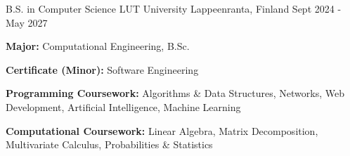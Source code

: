 

\begin{cventries}

  \cventryalt
    {B.S. in Computer Science} %
    {LUT University} %
    {Lappeenranta, Finland} %
    {Sept 2024 - May 2027} %
    {
      \begin{cvitems} %
        \item {\textbf{Major:} Computational Engineering, B.Sc.}
        \item {\textbf{Certificate (Minor):} Software Engineering}
        \item {\textbf{Programming Coursework:} Algorithms \& Data Structures, Networks, Web Development, Artificial Intelligence, Machine Learning}
        \item {\textbf{Computational Coursework:} Linear Algebra, Matrix Decomposition, Multivariate Calculus, Probabilities \& Statistics}
      \end{cvitems}
    }
\end{cventries}
\vspace{-3.0mm}
